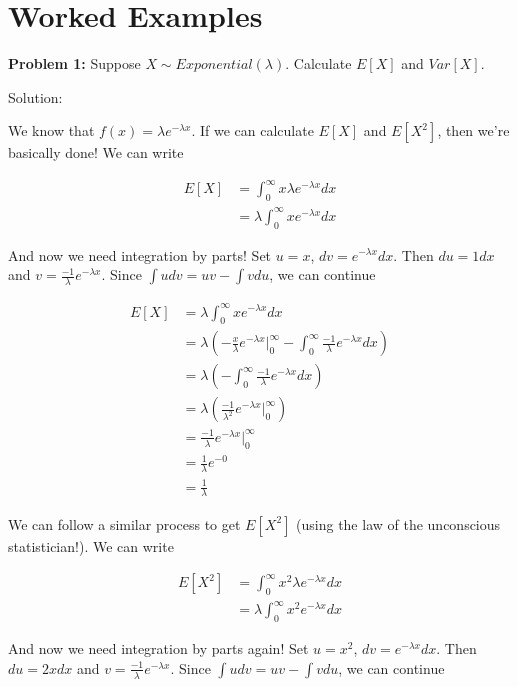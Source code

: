 \documentclass[
  letterpaper,
  DIV=11,
  numbers=noendperiod]{scrreprt}
\begin{document}
\section{Worked Examples}\label{worked-examples}

\textbf{Problem 1:} Suppose \(X \sim Exponential(\lambda)\). Calculate
\(E[X]\) and \(Var[X]\).

Solution:

We know that \(f(x) = \lambda e^{-\lambda x}\). If we can calculate
\(E[X]\) and \(E[X^2]\), then we're basically done! We can write

\begin{align*}    
E[X] & = \int_0^\infty x \lambda e^{-\lambda x} dx \\    
& = \lambda \int_0^\infty x e^{-\lambda x} dx 
\end{align*}

And now we need integration by parts! Set \(u = x\),
\(dv = e^{-\lambda x} dx\). Then \(du = 1dx\) and
\(v = \frac{-1}{\lambda} e^{-\lambda x}\). Since
\(\int u dv = uv - \int vdu\), we can continue

\begin{align*}    
E[X] & = \lambda \int_0^\infty x e^{-\lambda x} dx \\    
& = \lambda \left( -\frac{x}{\lambda} e^{-\lambda x} \bigg|_0^\infty  - \int_0^\infty \frac{-1}{\lambda} e^{-\lambda x} dx \right) \\    
& = \lambda \left( - \int_0^\infty \frac{-1}{\lambda} e^{-\lambda x} dx \right) \\    
& = \lambda \left( \frac{-1}{\lambda^2} e^{-\lambda x}  \bigg|_0^\infty \right) \\    
& = \frac{-1}{\lambda} e^{-\lambda x}  \bigg|_0^\infty \\    
& = \frac{1}{\lambda} e^{-0} \\    
& = \frac{1}{\lambda}
\end{align*}

We can follow a similar process to get \(E[X^2]\) (using the law of the
unconscious statistician!). We can write

\begin{align*}
    E[X^2] & = \int_0^\infty x^2 \lambda e^{-\lambda x} dx \\
    & = \lambda \int_0^\infty x^2 e^{-\lambda x} dx 
\end{align*}

And now we need integration by parts again! Set \(u = x^2\),
\(dv = e^{-\lambda x} dx\). Then \(du = 2xdx\) and
\(v = \frac{-1}{\lambda} e^{-\lambda x}\). Since
\(\int u dv = uv - \int vdu\), we can continue
\end{document}

